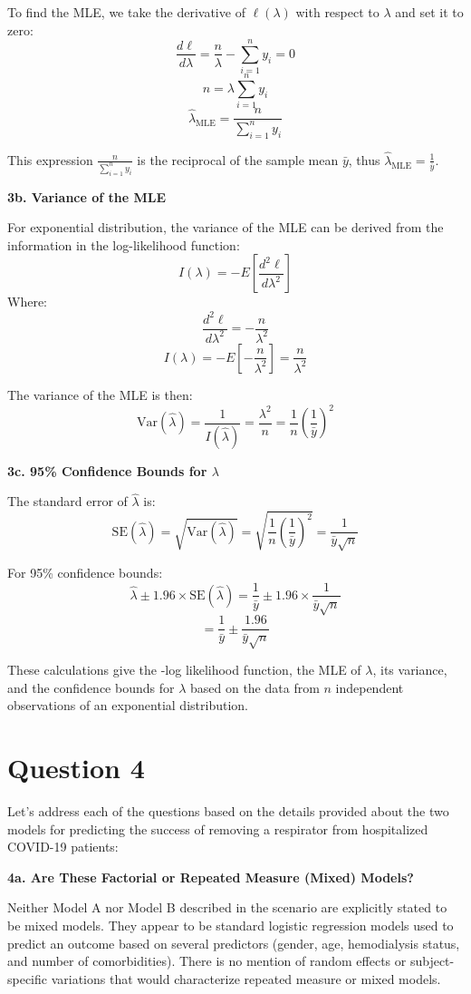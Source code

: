 \documentclass{article}
\begin{document}
To find the MLE, we take the derivative of \( \ell(\lambda) \) with respect to \( \lambda \) and set it to zero:
\[ \frac{d\ell}{d\lambda} = \frac{n}{\lambda} - \sum_{i=1}^n y_i = 0 \]
\[ n = \lambda \sum_{i=1}^n y_i \]
\[ \hat{\lambda}_{\text{MLE}} = \frac{n}{\sum_{i=1}^n y_i} \]

This expression \( \frac{n}{\sum_{i=1}^n y_i} \) is the reciprocal of the sample mean \( \bar{y} \), thus \( \hat{\lambda}_{\text{MLE}} = \frac{1}{\bar{y}} \).

\textbf{3b. Variance of the MLE}

For exponential distribution, the variance of the MLE can be derived from the information in the log-likelihood function:
\[ I(\lambda) = -E\left[\frac{d^2 \ell}{d\lambda^2}\right] \]
Where:
\[ \frac{d^2 \ell}{d\lambda^2} = -\frac{n}{\lambda^2} \]
\[ I(\lambda) = -E\left[-\frac{n}{\lambda^2}\right] = \frac{n}{\lambda^2} \]

The variance of the MLE is then:
\[ \text{Var}(\hat{\lambda}) = \frac{1}{I(\hat{\lambda})} = \frac{\lambda^2}{n} = \frac{1}{n} \left(\frac{1}{\bar{y}}\right)^2 \]

\textbf{3c. 95\% Confidence Bounds for \( \lambda \)}

The standard error of \( \hat{\lambda} \) is:
\[ \text{SE}(\hat{\lambda}) = \sqrt{\text{Var}(\hat{\lambda})} = \sqrt{\frac{1}{n} \left(\frac{1}{\bar{y}}\right)^2} = \frac{1}{\bar{y}\sqrt{n}} \]

For 95\% confidence bounds:
\[ \hat{\lambda} \pm 1.96 \times \text{SE}(\hat{\lambda}) = \frac{1}{\bar{y}} \pm 1.96 \times \frac{1}{\bar{y}\sqrt{n}} \]
\[ = \frac{1}{\bar{y}} \pm \frac{1.96}{\bar{y}\sqrt{n}} \]

These calculations give the -log likelihood function, the MLE of \( \lambda \), its variance, and the confidence bounds for \( \lambda \) based on the data from \( n \) independent observations of an exponential distribution.

\section{Question 4}

Let's address each of the questions based on the details provided about the two models for predicting the success of removing a respirator from hospitalized COVID-19 patients:

\textbf{4a. Are These Factorial or Repeated Measure (Mixed) Models?}

Neither Model A nor Model B described in the scenario are explicitly stated to be mixed models. They appear to be standard logistic regression models used to predict an outcome based on several predictors (gender, age, hemodialysis status, and number of comorbidities). There is no mention of random effects or subject-specific variations that would characterize repeated measure or mixed models.
\end{document}
